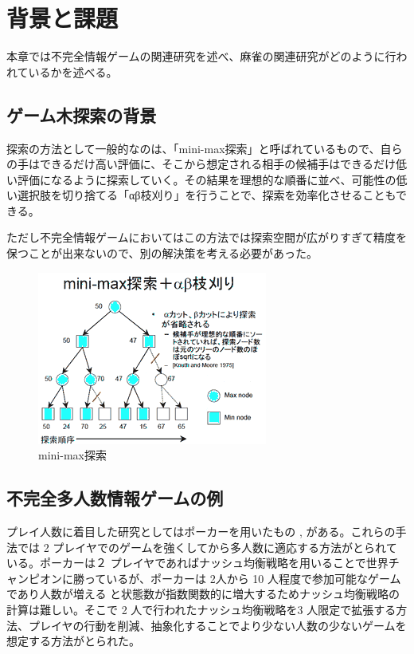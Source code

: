 \chapter{背景と課題}
\label{chap:relevantstudy}

本章では不完全情報ゲームの関連研究を述べ、麻雀の関連研究がどのように行われているかを述べる。


\section{ゲーム木探索の背景}
探索の方法として一般的なのは、「mini-max探索」と呼ばれているもので、自らの手はできるだけ高い評価に、そこから想定される相手の候補手はできるだけ低い評価になるように探索していく。その結果を理想的な順番に並べ、可能性の低い選択肢を切り捨てる「αβ枝刈り」を行うことで、探索を効率化させることもできる。

ただし不完全情報ゲームにおいてはこの方法では探索空間が広がりすぎて精度を保つことが出来ないので、別の解決策を考える必要があった。

\begin{figure}
 \centering
 \includegraphics[keepaspectratio, scale=1.0,bb=0 0 286 215]
      {img/minimax.png}
 \caption{mini-max探索}
 \label{monte2}
\end{figure}


\section{不完全多人数情報ゲームの例}
プレイ人数に着目した研究としてはポーカーを用いたもの \cite{poker},\cite{hurui} がある。これらの手法では 2 プレイヤでのゲームを強くしてから多人数に適応する方法がとられている。ポーカーは２ プレイヤであればナッシュ均衡戦略を用いることで世界チャンピオンに勝っているが、ポーカーは 2人から 10 人程度で参加可能なゲームであり人数が増える
と状態数が指数関数的に増大するためナッシュ均衡戦略の計算は難しい。そこで 2 人で行われたナッシュ均衡戦略を3 人限定で拡張する方法、プレイヤの行動を削減、抽象化することでより少ない人数の少ないゲームを想定する方法がとられた。

